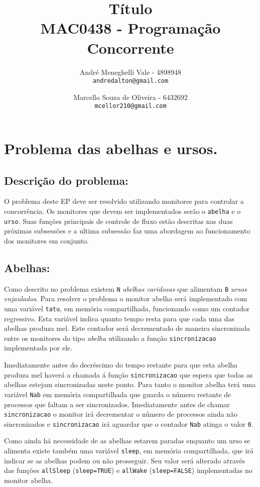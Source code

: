 \documentclass[12pt,a4paper]{article}
\title{Título\\MAC0438 - Programação Concorrente}
\author{
    André Meneghelli Vale - 4898948\\
    \texttt{andredalton@gmail.com}
    \and
    Marcello Souza de Oliveira - 6432692\\
    \texttt{mcellor210@gmail.com}
}
\date{}
\begin{document}
\maketitle

\newpage

\section{Problema das abelhas e ursos.}

\subsection{Descrição do problema:}

O problema deste EP deve ser resolvido utilizando monitores para controlar a concorrência. Os monitores que devem ser implementados serão o \verb+abelha+ e o \verb+urso+. Suas funções principais de controle de fluxo estão descritas nas duas próximas subsessões e a ultima subsessão faz uma abordagem ao funcionamento dos monitores em conjunto.

\subsection{Abelhas:}

Como descrito no problema existem \verb+N+ \emph{abelhas caridosas} que alimentam \verb+B+ \emph{ursos enjaulados}. Para resolver o problema o monitor abelha será implementado com uma variável \verb+tatu+, em memória compartilhada, funcionando como um contador regressivo. Esta variável indica quanto tempo resta para que cada uma das abelhas produza mel. Este contador será decrementado de maneira sincronizada entre os monitores do tipo \emph{abelha} utilizando a função \verb+sincronizacao+ implementada por ele.

Imediatamente antes do decréscimo do tempo restante para que esta abelha produza mel haverá a chamada á função \verb+sincronizacao+ que espera que todas as abelhas estejam sincronizadas neste ponto. Para tanto o monitor abelha terá uma variável \verb+Nab+ em memória compartilhada que guarda o número restante de processos que faltam a ser sincronizados. Imediatamente antes de chamar \verb+sincronizacao+ o monitor irá decrementar o número de processos ainda não sincronizados e \verb+sincronizacao+ irá aguardar que o contador \verb+Nab+ atinga o valor \verb+0+.

Como ainda há necessidade de as abelhas estarem paradas enquanto um urso se alimenta existe também uma variável \verb+sleep+, em memória compartilhada, que irá indicar se as abelhas podem ou não prosseguir. Seu valor será alterado através das funções \verb+allSleep+ (\verb+sleep=TRUE+) e \verb+allWake+ (\verb+sleep=FALSE+) implementadas no monitor abelha.
\end{document}
